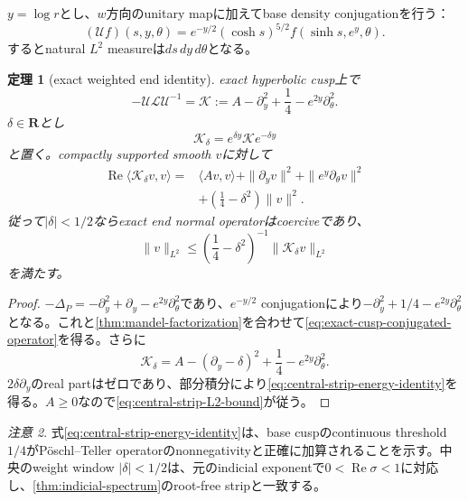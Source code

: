 \documentclass[11pt,a4paper]{ltjsarticle}
\newtheorem{theorem}{定理}[section]
\theoremstyle{definition}
\theoremstyle{remark}
\newtheorem{remark}[theorem]{注意}
\newcommand{\RR}{\mathbf R}
\begin{document}
$y=\log r$とし、$w$方向のunitary mapに加えてbase density conjugationを行う：
\begin{equation}\label{eq:double-unitary-map}
 (\mathcal U f)(s,y,\theta)
 =e^{-y/2}(\cosh s)^{5/2}
 f(\sinh s,e^y,\theta).
\end{equation}
するとnatural $L^2$ measureは$ds\,dy\,d\theta$となる。

\begin{theorem}[exact weighted end identity]\label{thm:weighted-end-identity}
exact hyperbolic cusp上で
\begin{equation}\label{eq:exact-cusp-conjugated-operator}
 -\mathcal U\mathscr L\mathcal U^{-1}
 =\mathcal K
 :=A-\partial_y^2+\frac14-e^{2y}\partial_\theta^2.
\end{equation}
$\delta\in\RR$とし
\[
 \mathcal K_\delta=e^{\delta y}\mathcal K e^{-\delta y}
\]
と置く。compactly supported smooth $v$に対して
\begin{equation}\label{eq:central-strip-energy-identity}
 \begin{aligned}
 \operatorname{Re}\langle\mathcal K_\delta v,v\rangle
 ={}&\langle Av,v\rangle
 +\|\partial_yv\|^2
 +\|e^y\partial_\theta v\|^2\\
 &+\left(\frac14-\delta^2\right)\|v\|^2.
 \end{aligned}
\end{equation}
従って$|\delta|<1/2$ならexact end normal operatorはcoerciveであり、
\begin{equation}\label{eq:central-strip-L2-bound}
 \|v\|_{L^2}
 \le
 \left(\frac14-\delta^2\right)^{-1}
 \|\mathcal K_\delta v\|_{L^2}
\end{equation}
を満たす。
\end{theorem}

\begin{proof}
$-\Delta_P=-\partial_y^2+\partial_y-e^{2y}\partial_\theta^2$であり、$e^{-y/2}$ conjugationにより$-\partial_y^2+1/4-e^{2y}\partial_\theta^2$となる。これと\cref{thm:mandel-factorization}を合わせて\eqref{eq:exact-cusp-conjugated-operator}を得る。さらに
\[
 \mathcal K_\delta
 =A-(\partial_y-\delta)^2+\frac14-e^{2y}\partial_\theta^2.
\]
$2\delta\partial_y$のreal partはゼロであり、部分積分により\eqref{eq:central-strip-energy-identity}を得る。$A\ge0$なので\eqref{eq:central-strip-L2-bound}が従う。
\end{proof}

\begin{remark}
式\eqref{eq:central-strip-energy-identity}は、base cuspのcontinuous threshold $1/4$がPöschl--Teller operatorのnonnegativityと正確に加算されることを示す。中央のweight window $|\delta|<1/2$は、元のindicial exponentで$0<\operatorname{Re}\sigma<1$に対応し、\cref{thm:indicial-spectrum}のroot-free stripと一致する。
\end{remark}
\end{document}

